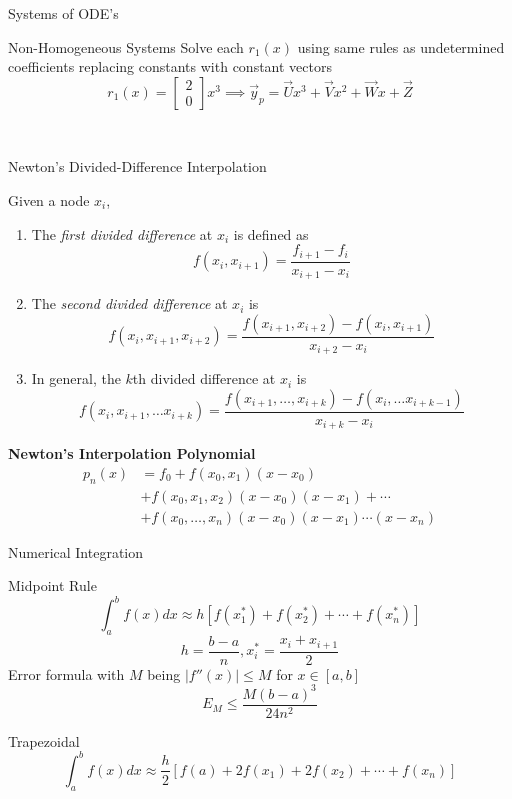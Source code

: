 \documentclass{article}
\begin{document}
\begin{multicols*}{3}
\begin{blackbox}{Systems of ODE's}
{\begin{bluebox}{Non-Homogeneous Systems}
{        }
        Solve each $r_1(x)$ using same rules as undetermined coefficients replacing constants with constant vectors
        \[r_1(x) = \begin{bmatrix}
            2\\0
        \end{bmatrix}x^3 \implies \vec{y}_p = \vec{U}x^3 + \vec{V}x^2 + \vec{W}x + \vec{Z} \]
    \end{bluebox}\\[-2ex]
    }
\end{blackbox}
\begin{blackbox}{Newton's Divided-Difference Interpolation}
    {\footnotesize
    Given a node $x_i$, 
    \begin{enumerate}[leftmargin=5pt]
        \item The \emph{first divided difference} at $x_i$ is defined as 
        \[f(x_i,x_{i+1}) = \frac{f_{i+1}- f_i}{x_{i+1} - x_i}\]
        \item The \emph{second divided difference} at $x_i$ is 
        \[f(x_i, x_{i+1}, x_{i+2}) = \frac{f(x_{i+1}, x_{i+2}) - f(x_i,x_{i+1})}{x_{i+2}-x_i}\]
        \item In general, the $k$th divided difference at $x_i$ is 
        \[f(x_i, x_{i+1}, \ldots x_{i+k}) = \frac{f(x_{i+1},\ldots, x_{i+k}) - f(x_i, \ldots x_{i+k-1})}{x_{i+k}-x_i}\]
    \end{enumerate}
    \textbf{Newton's Interpolation Polynomial} 
    \begin{align*}
        p_n(x) &= f_0 + f(x_0,x_1)(x-x_0)\\
        &+ f(x_0,x_1,x_2)(x-x_0)(x-x_1) + \cdots\\
        &+ f(x_0,\ldots,x_n)(x-x_0)(x-x_1)\cdots(x - x_n)
    \end{align*}
    }
\end{blackbox}
\begin{blackbox}{Numerical Integration}
    {\footnotesize
        \begin{bluebox}{Midpoint Rule}
            \[\int_a^b f(x)dx \approx h[f(x_1^*) + f(x_2^*) + \cdots + f(x_n^*)]\]
            \[h = \frac{b-a}{n}, x_i^* = \frac{x_i + x_{i+1}}{2}\]
            Error formula with $M$ being $|f''(x)| \leq M$ for $x \in [a,b]$
            \[E_M \leq \frac{M(b-a)^3}{24n^2}\]
        \end{bluebox}
        \begin{brownbox}{Trapezoidal}
            \[\int_a^b f(x)dx\approx \frac{h}{2}\left[f(a) + 2f(x_1) + 2f(x_2) + \cdots + f(x_n)\right]\]

\end{brownbox}}
\end{blackbox}
\end{multicols*}
\end{document}
